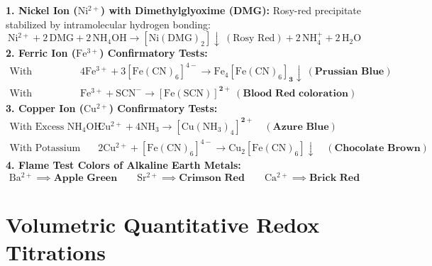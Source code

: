 \documentclass[10pt,a4paper]{article}
\begin{document}
\begin{formulabox}
\textbf{1. Nickel Ion ($\mathrm{Ni^{2+}}$) with Dimethylglyoxime (DMG):}
Rosy-red precipitate stabilized by intramolecular hydrogen bonding:
\begin{equation}
  \mathrm{Ni^{2+}} + 2\,\mathrm{DMG} + 2\,\mathrm{NH_4OH} \longrightarrow \mathbf{[\mathrm{Ni(DMG)_2}] \downarrow} \ (\text{Rosy Red}) + 2\,\mathrm{NH_4^+} + 2\,\mathrm{H_2O}
\end{equation}
\textbf{2. Ferric Ion ($\mathrm{Fe^{3+}}$) Confirmatory Tests:}
\begin{align*}
  \text{With Potassium Ferrocyanide: } & 4\mathrm{Fe^{3+}} + 3[\mathrm{Fe(CN)_6}]^{4-} \longrightarrow \mathbf{\mathrm{Fe_4}[\mathrm{Fe(CN)_6}]_3 \downarrow} \ (\textbf{Prussian Blue})\\
  \text{With Potassium Thiocyanate: } & \mathrm{Fe^{3+}} + \mathrm{SCN^-} \longrightarrow \mathbf{[\mathrm{Fe(SCN)}]^{2+}} \ (\textbf{Blood Red coloration})
\end{align*}
\textbf{3. Copper Ion ($\mathrm{Cu^{2+}}$) Confirmatory Tests:}
\begin{align*}
  \text{With Excess } \mathrm{NH_4OH}: \quad & \mathrm{Cu^{2+}} + 4\mathrm{NH_3} \longrightarrow \mathbf{[\mathrm{Cu(NH_3)_4}]^{2+}} \quad (\textbf{Azure Blue})\\
  \text{With Potassium Ferrocyanide: } & 2\mathrm{Cu^{2+}} + [\mathrm{Fe(CN)_6}]^{4-} \longrightarrow \mathbf{\mathrm{Cu_2}[\mathrm{Fe(CN)_6}] \downarrow} \quad (\textbf{Chocolate Brown})
\end{align*}
\textbf{4. Flame Test Colors of Alkaline Earth Metals:}
\begin{equation}
  \mathbf{\mathrm{Ba^{2+}} \implies \text{Apple Green}} \qquad \mathbf{\mathrm{Sr^{2+}} \implies \text{Crimson Red}} \qquad \mathbf{\mathrm{Ca^{2+}} \implies \text{Brick Red}}
\end{equation}
\end{formulabox}

\section{Volumetric Quantitative Redox Titrations}
\end{document}
